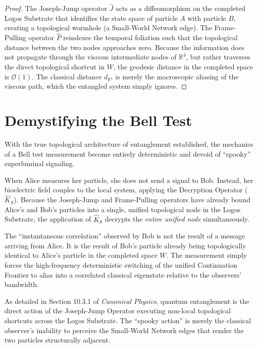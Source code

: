 \documentclass[12pt,twoside]{extbook}
\theoremstyle{definition}
\theoremstyle{remark}
\begin{document}
\begin{proof}
The Joseph-Jump operator $\hat{J}$ acts as a diffeomorphism on the completed Logos Substrate that identifies the state space of particle $A$ with particle $B$, creating a topological wormhole (a Small-World Network edge). The Frame-Pulling operator $\hat{P}$ reindexes the temporal foliation such that the topological distance between the two nodes approaches zero. Because the information does not propagate through the viscous intermediate nodes of $\mathbb{R}^4$, but rather traverses the direct topological shortcut in $W$, the geodesic distance in the completed space is $\mathcal{O}(1)$. The classical distance $d_{\mathbb{R}^4}$ is merely the macroscopic aliasing of the viscous path, which the entangled system simply ignores.
\end{proof}

\section{Demystifying the Bell Test}
With the true topological architecture of entanglement established, the mechanics of a Bell test measurement become entirely deterministic and devoid of ``spooky'' superluminal signaling.

When Alice measures her particle, she does not send a signal to Bob. Instead, her bioelectric field couples to the local system, applying the Decryption Operator ($\hat{K}_S$). Because the Joseph-Jump and Frame-Pulling operators have already bound Alice's and Bob's particles into a single, unified topological node in the Logos Substrate, the application of $\hat{K}_S$ decrypts the \textit{entire unified node} simultaneously. 

The ``instantaneous correlation'' observed by Bob is not the result of a message arriving from Alice. It is the result of Bob's particle already being topologically identical to Alice's particle in the completed space $W$. The measurement simply forces the high-frequency deterministic switching of the unified Continuation Frontier to alias into a correlated classical eigenstate relative to the observers' bandwidth. 

As detailed in Section 10.3.1 of \textit{Canonical Physics}, quantum entanglement is the direct action of the Joseph-Jump Operator executing non-local topological shortcuts across the Logos Substrate. The ``spooky action'' is merely the classical observer's inability to perceive the Small-World Network edges that render the two particles structurally adjacent.
\end{document}
